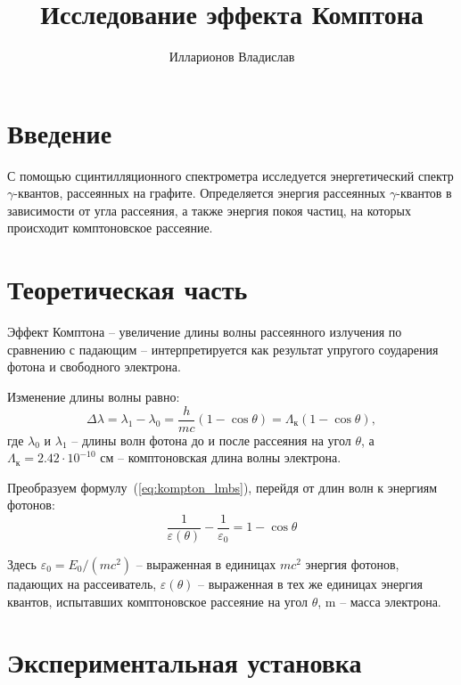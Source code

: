 \documentclass[reprint, nofootinbib, nobalancelastpage, 10pt]{revtex4-2}
\begin{document}
\title{Исследование эффекта Комптона}
\author{Илларионов Владислав}

\maketitle


\section*{Введение}

С помощью сцинтилляционного спектрометра исследуется энергетический спектр
$\gamma$-квантов, рассеянных на графите. Определяется энергия рассеянных
\mbox{$\gamma$-квантов} в зависимости от угла рассеяния, а также энергия покоя частиц,
на которых происходит комптоновское рассеяние.


\section*{Теоретическая часть}

Эффект Комптона -- увеличение длины волны рассеянного излучения по сравнению с падающим --
интерпретируется как результат упругого соударения фотона и свободного электрона.

Изменение длины волны равно:
\begin{equation}
	\label{eq:kompton_lmbs}
	\Delta \lambda = \lambda_1 - \lambda_0 = \dfrac{h}{mc}(1 - \cos \theta) =
		\Lambda_{\text{к}} (1 - \cos \theta),
\end{equation}
где $\lambda_0$ и $\lambda_1$ -- длины волн фотона до и после рассеяния на угол $\theta$,
а $\Lambda_{\text{к}} = 2.42 \cdot 10^{-10}$ см -- комптоновская длина волны электрона.

Преобразуем формулу~(\ref*{eq:kompton_lmbs}), перейдя от длин волн к энергиям фотонов:
\begin{equation}
	\label{eq:kompton_enrg}
	\dfrac{1}{\varepsilon(\theta)} - \dfrac{1}{\varepsilon_0} = 1 - \cos \theta
\end{equation}

Здесь $\varepsilon_0 = E_0/(mc^2)$ -- выраженная в единицах $mc^2$ энергия фотонов,
падающих на рассеиватель, $\varepsilon(\theta)$ -- выраженная в тех же единицах энергия
квантов, испытавших комптоновское рассеяние на угол $\theta$, m -- масса электрона.


\section*{Экспериментальная установка}
\end{document}
